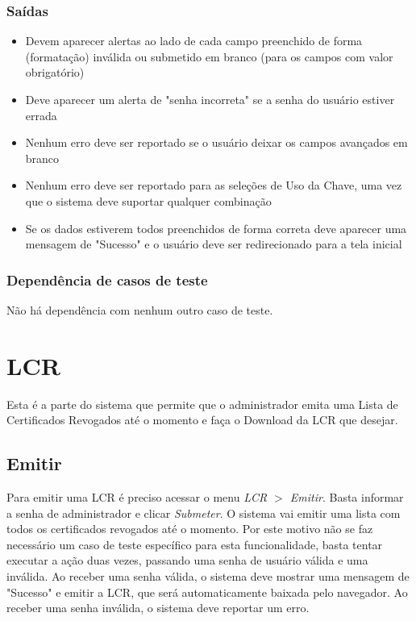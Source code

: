 \subsubsection{Saídas}

\begin{itemize}

	\item Devem aparecer alertas ao lado de cada campo preenchido de forma (formatação) inválida ou submetido em branco (para os campos com valor obrigatório)
	\item Deve aparecer um alerta de "senha incorreta" se a senha do usuário estiver errada
	\item Nenhum erro deve ser reportado se o usuário deixar os campos avançados em branco
	\item Nenhum erro deve ser reportado para as seleções de Uso da Chave, uma vez que o sistema deve suportar qualquer combinação
	\item Se os dados estiverem todos preenchidos de forma correta deve aparecer uma mensagem de "Sucesso" e o usuário deve ser redirecionado para a tela inicial
	
\end{itemize}

\subsubsection{Dependência de casos de teste}
Não há dependência com nenhum outro caso de teste.

\section{LCR}

Esta é a parte do sistema que permite que o administrador emita uma Lista de Certificados Revogados até o momento e faça o Download da LCR que desejar.

\subsection{Emitir}

Para emitir uma LCR é preciso acessar o menu \textit{LCR $>$ Emitir}. Basta informar a senha de administrador e clicar \emph{Submeter}. O sistema vai emitir uma lista com todos os certificados revogados até o momento. Por este motivo não se faz necessário um  caso de teste específico para esta funcionalidade, basta tentar executar a ação duas vezes, passando uma senha de usuário válida e uma inválida. Ao receber uma senha válida, o sistema deve mostrar uma mensagem de "Sucesso" e emitir a LCR, que será automaticamente baixada pelo navegador. Ao receber uma senha inválida, o sistema deve reportar um erro.

